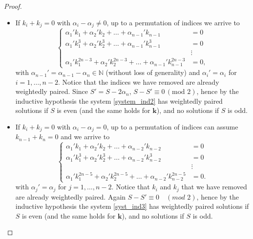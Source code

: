 \documentclass[a4paper,10pt,reqno]{article}
\theoremstyle{definition}
\theoremstyle{plain}
\theoremstyle{plain}
\theoremstyle{definition}
\theoremstyle{plain}
\theoremstyle{plain}
\theoremstyle{plain}
\theoremstyle{definition}
\theoremstyle{definition}
\def \N{\mathbb N}
\def \k{\bm{k}}
\begin{document}
\begin{proof}
\begin{itemize}
\item If $k_i+k_j=0$ with $\alpha_i-\alpha_j \neq 0$, up to a permutation of indices we arrive to 
\begin{equation} \label{system_ind2}
\begin{cases}
\alpha_1' k_1 + \alpha_2' k_2+\ldots+ \alpha_{n-1}' k_{n-1} & = 0 \\
\alpha_1' k_1^3 + \alpha_2' k_2^3 + \ldots+ \alpha_{n-1}' k_{n-1}^3 & = 0 \\
& \vdots \\
\alpha_1' k_1^{2n-3} + \alpha_2' k_2^{2n-3} +\ldots + \alpha_{n-1}' k_{n-1}^{2n-3} & =0,
\end{cases}
\end{equation}
with $\alpha_{n-1}' = \alpha_{n-1}-\alpha_{n} \in \N$ (without loss of generality) and $\alpha_i' = \alpha_i$ for $i=1,\ldots,n-2$. Notice that the indices we have removed are already weightedly paired. 
Since $S'=S-2\alpha_n$, $S-S' \equiv 0 \, (\mathrm{mod} \, \, 2)$, hence by the inductive hypothesis the system \eqref{system_ind2} has weightedly paired solutions if $S$ is even (and the same holds for $\k$), and no solutions if $S$ is odd. 

\item If $k_i+k_j=0$ with $\alpha_i-\alpha_j = 0$, up to a permutation of indices can assume $k_{n-1}+k_n=0$ and we arrive to 
\begin{equation} \label{syst_ind3}
\begin{cases}
\alpha_1' k_1 + \alpha_2' k_2+\ldots+ \alpha_{n-2}' k_{n-2} & = 0 \\
\alpha_1' k_1^3 + \alpha_2' k_2^3 + \ldots+ \alpha_{n-2}' k_{n-2}^3 & = 0 \\
& \vdots \\
\alpha_1' k_1^{2n-5} + \alpha_2' k_2^{2n-5} +\ldots + \alpha_{n-2}' k_{n-2}^{2n-5} & =0.
\end{cases}
\end{equation}
with $\alpha_j'=\alpha_j$ for $j=1,\ldots,n-2$.
Notice that $k_i$ and $k_j$ that we have removed are already weightedly paired. Again $S-S' \equiv 0 \quad (mod \, \, 2)$, hence by the inductive hypothesis the system \eqref{syst_ind3} has weightedly paired solutions if $S$ is even (and the same holds for $\k$), and no solutions if $S$ is odd. 
\end{itemize}
\end{proof}

\end{document}
